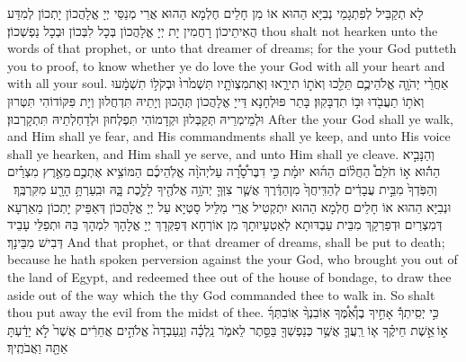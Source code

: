 {לָא תְקַבֵּיל לְפִתְגָמֵי נְבִיָּא הַהוּא אוֹ מִן חָלֵים חֶלְמָא הַהוּא אֲרֵי מְנַסֵּי יְיָ אֱלָהֲכוֹן יָתְכוֹן לְמִדַּע הֲאִיתֵיכוֹן רָחֲמִין יָת יְיָ אֱלָהֲכוֹן בְּכָל לִבְּכוֹן וּבְכָל נַפְשְׁכוֹן׃}
{thou shalt not hearken unto the words of that prophet, or unto that dreamer of dreams; for the \lord\space your God putteth you to proof, to know whether ye do love the \lord\space your God with all your heart and with all your soul.}{}
{אַחֲרֵ֨י יְהֹוָ֧ה אֱלֹהֵיכֶ֛ם תֵּלֵ֖כוּ וְאֹת֣וֹ תִירָ֑אוּ וְאֶת\maqqaf מִצְוֺתָ֤יו תִּשְׁמֹ֙רוּ֙ וּבְקֹל֣וֹ תִשְׁמָ֔עוּ וְאֹת֥וֹ תַעֲבֹ֖דוּ וּב֥וֹ תִדְבָּקֽוּן׃}
{בָּתַר פּוּלְחָנָא דַּייָ אֱלָהֲכוֹן תְּהָכוּן וְיָתֵיהּ תִּדְחֲלוּן וְיָת פִּקּוֹדוֹהִי תִּטְּרוּן וּלְמֵימְרֵיהּ תְּקַבְּלוּן וּקְדָמוֹהִי תִּפְלְחוּן וּלְדַחְלְתֵיהּ תִּתְקָרְבוּן׃}
{After the \lord\space your God shall ye walk, and Him shall ye fear, and His commandments shall ye keep, and unto His voice shall ye hearken, and Him shall ye serve, and unto Him shall ye cleave.}{}
{וְהַנָּבִ֣יא הַה֡וּא א֣וֹ חֹלֵם֩ הַחֲל֨וֹם הַה֜וּא יוּמָ֗ת כִּ֣י דִבֶּר\maqqaf סָ֠רָ֠ה עַל\maqqaf יְהֹוָ֨ה אֱלֹֽהֵיכֶ֜ם הַמּוֹצִ֥יא אֶתְכֶ֣ם \legarmeh  מֵאֶ֣רֶץ מִצְרַ֗יִם וְהַפֹּֽדְךָ֙ מִבֵּ֣ית עֲבָדִ֔ים לְהַדִּֽיחֲךָ֙ מִן\maqqaf הַדֶּ֔רֶךְ אֲשֶׁ֧ר צִוְּךָ֛ יְהֹוָ֥ה אֱלֹהֶ֖יךָ לָלֶ֣כֶת בָּ֑הּ וּבִֽעַרְתָּ֥ הָרָ֖ע מִקִּרְבֶּֽךָ׃ \setuma }
{וּנְבִיָּא הַהוּא אוֹ חָלֵים חֶלְמָא הַהוּא יִתְקְטִיל אֲרֵי מַלֵּיל סָטְיָא עַל יְיָ אֱלָהֲכוֹן דְּאַפֵּיק יָתְכוֹן מֵאַרְעָא דְּמִצְרַיִם וּדְפַרְקָךְ מִבֵּית עַבְדּוּתָא לְאַטְעָיוּתָךְ מִן אוֹרְחָא דְּפַקְּדָךְ יְיָ אֱלָהָךְ לִמְהָךְ בַּהּ וּתְפַלֵּי עָבֵיד דְּבִישׁ מִבֵּינָךְ׃}
{And that prophet, or that dreamer of dreams, shall be put to death; because he hath spoken perversion against the \lord\space your God, who brought you out of the land of Egypt, and redeemed thee out of the house of bondage, to draw thee aside out of the way which the \lord\space thy God commanded thee to walk in. So shalt thou put away the evil from the midst of thee.}{}
{כִּ֣י יְסִֽיתְךָ֡ אָחִ֣יךָ בֶן\maqqaf אִ֠מֶּ֠ךָ אֽוֹ\maqqaf בִנְךָ֨ אֽוֹ\maqqaf בִתְּךָ֜ א֣וֹ \legarmeh  אֵ֣שֶׁת חֵיקֶ֗ךָ א֧וֹ רֵֽעֲךָ֛ אֲשֶׁ֥ר כְּנַפְשְׁךָ֖ בַּסֵּ֣תֶר לֵאמֹ֑ר נֵֽלְכָ֗ה וְנַֽעַבְדָה֙ אֱלֹהִ֣ים אֲחֵרִ֔ים אֲשֶׁר֙ לֹ֣א יָדַ֔עְתָּ אַתָּ֖ה וַאֲבֹתֶֽיךָ׃}
